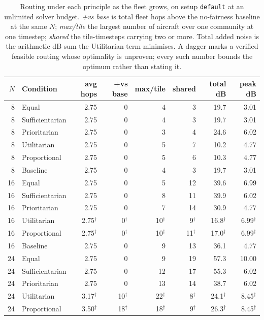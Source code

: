 \begin{table}[t]
\centering
\caption{Routing under each principle as the fleet grows, on setup \texttt{default} at an unlimited solver budget. \emph{+vs base} is total fleet hops above the no-fairness baseline at the same $N$; \emph{max/tile} the largest number of aircraft over one community at one timestep; \emph{shared} the tile-timesteps carrying two or more. Total added noise is the arithmetic dB sum the Utilitarian term minimises. A dagger marks a verified feasible routing whose optimality is unproven; every such number bounds the optimum rather than stating it.}
\label{tab:fleet}
\begin{tabular}{r l rr rr rr}
\toprule
$N$ & Condition & avg hops & +vs base & max/tile & shared & total dB & peak dB \\
\midrule
8 & Equal & 2.75 & 0 & 4 & 3 & 19.7 & 3.01 \\
8 & Sufficientarian & 2.75 & 0 & 4 & 3 & 19.7 & 3.01 \\
8 & Prioritarian & 2.75 & 0 & 3 & 4 & 24.6 & 6.02 \\
8 & Utilitarian & 2.75 & 0 & 5 & 7 & 10.2 & 4.77 \\
8 & Proportional & 2.75 & 0 & 5 & 6 & 10.3 & 4.77 \\
8 & Baseline & 2.75 & 0 & 4 & 3 & 19.7 & 3.01 \\
\midrule
16 & Equal & 2.75 & 0 & 5 & 12 & 39.6 & 6.99 \\
16 & Sufficientarian & 2.75 & 0 & 8 & 11 & 39.9 & 6.02 \\
16 & Prioritarian & 2.75 & 0 & 7 & 14 & 30.9 & 4.77 \\
16 & Utilitarian & 2.75$^\dagger$ & 0$^\dagger$ & 10$^\dagger$ & 9$^\dagger$ & 16.8$^\dagger$ & 6.99$^\dagger$ \\
16 & Proportional & 2.75$^\dagger$ & 0$^\dagger$ & 10$^\dagger$ & 11$^\dagger$ & 17.0$^\dagger$ & 6.99$^\dagger$ \\
16 & Baseline & 2.75 & 0 & 9 & 13 & 36.1 & 4.77 \\
\midrule
24 & Equal & 2.75 & 0 & 9 & 19 & 57.3 & 10.00 \\
24 & Sufficientarian & 2.75 & 0 & 12 & 17 & 55.3 & 6.02 \\
24 & Prioritarian & 2.75 & 0 & 13 & 14 & 38.7 & 6.02 \\
24 & Utilitarian & 3.17$^\dagger$ & 10$^\dagger$ & 22$^\dagger$ & 8$^\dagger$ & 24.1$^\dagger$ & 8.45$^\dagger$ \\
24 & Proportional & 3.50$^\dagger$ & 18$^\dagger$ & 18$^\dagger$ & 9$^\dagger$ & 26.3$^\dagger$ & 8.45$^\dagger$ \\

\end{tabular}
\end{table}
